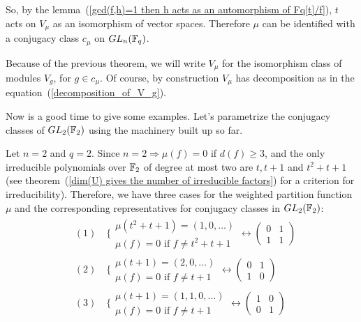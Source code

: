 So, by the lemma~(\ref{gcd(f,h)=1 then h acts as an automorphism of Fq[t]/f}), $t$ acts on $V_{\mu}$ as an isomorphism of vector spaces. Therefore $\mu$ can be identified with a conjugacy class $c_{\mu}$ on $GL_n(\mathbb{F}_q)$.\par
\begin{dang}
    \begin{notation}
        Because of the previous theorem, we will write $V_\mu$ for the isomorphism class of modules $V_g$, for $g\in c_\mu$. Of course, by construction $V_\mu$ has decomposition as in the equation~(\ref{decomposition_of_V_g}).
    \end{notation}
\end{dang}
Now is a good time to give some examples. Let's parametrize the conjugacy classes of $GL_2(\mathbb{F}_2)$ using the machinery built up so far.  
\begin{dang}
    \begin{example}\label{Example: conjucacy classes of GL2(F2)}
        Let $n=2$ and $q=2$. Since $n=2\Rightarrow \mu(f)=0$ if $d(f)\geq3$, and the only irreducible polynomials over $\mathbb{F}_2$ of degree at most two are $t, t+1$ and $t^2+t+1$ (see theorem~(\ref{dim(U) gives the number of irreducible factors}) for a criterion for irreducibility). Therefore, we have three cases for the weighted partition function $\mu$ and the corresponding representatives for conjugacy classes in $GL_2(\mathbb{F}_2)$:
        \begin{align*}
            &  (1)\quad\Biggl\{\begin{matrix}
       \mu(t^2+t+1)=(1,0,\dots)\\
       \mu(f)=0\text{ if }f\neq t^2+t+1
        \end{matrix}\longleftrightarrow 
        \begin{pmatrix}
            0&1\\
            1&1
        \end{pmatrix}\\    
   &(2)\quad\Biggl\{\begin{matrix}
       \mu(t+1)=(2,0,\dots)\\
       \mu(f)=0\text{ if }f\neq t+1
   \end{matrix}\longleftrightarrow 
        \begin{pmatrix}
            0&1\\
            1&0
        \end{pmatrix}\\
   &(3)\quad\Biggl\{\begin{matrix}
       \mu(t+1)=(1,1,0,\dots)\\
       \mu(f)=0\text{ if }f\neq t+1
   \end{matrix}\longleftrightarrow 
        \begin{pmatrix}
            1&0\\
            0&1
        \end{pmatrix}
        \end{align*}
    \end{example}
\end{dang}
